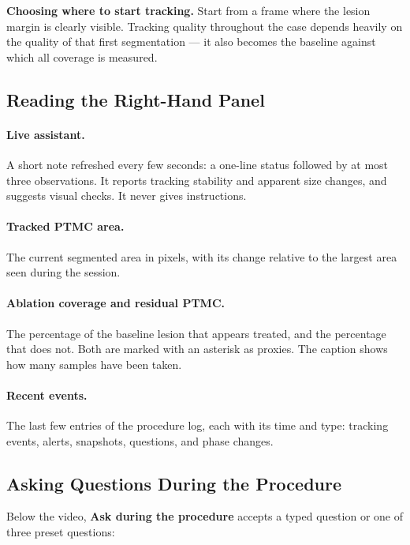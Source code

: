 \documentclass[11pt,a4paper]{article}
\newcommand{\ui}[1]{\textbf{#1}}
\begin{document}
\begin{tipbox}
\textbf{Choosing where to start tracking.} Start from a frame where the lesion
margin is clearly visible. Tracking quality throughout the case depends
heavily on the quality of that first segmentation --- it also becomes the
baseline against which all coverage is measured.
\end{tipbox}

\subsection{Reading the Right-Hand Panel}

\paragraph{Live assistant.} A short note refreshed every few seconds: a
one-line status followed by at most three observations. It reports tracking
stability and apparent size changes, and suggests visual checks. It never
gives instructions.

\paragraph{Tracked PTMC area.} The current segmented area in pixels, with its
change relative to the largest area seen during the session.

\paragraph{Ablation coverage and residual PTMC.} The percentage of the
baseline lesion that appears treated, and the percentage that does not. Both
are marked with an asterisk as proxies. The caption shows how many samples
have been taken.

\paragraph{Recent events.} The last few entries of the procedure log, each
with its time and type: tracking events, alerts, snapshots, questions, and
phase changes.

\subsection{Asking Questions During the Procedure}

Below the video, \ui{Ask during the procedure} accepts a typed question or one
of three preset questions:
\end{document}
